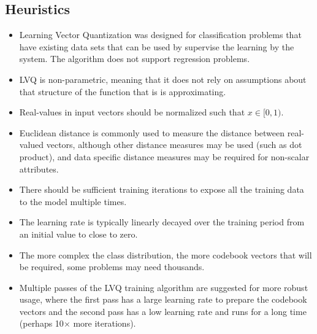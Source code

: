 \subsection{Heuristics}
\begin{itemize}
	\item Learning Vector Quantization was designed for classification problems that have existing data sets that can be used by supervise the learning by the system. The algorithm does not support regression problems.
	\item LVQ is non-parametric, meaning that it does not rely on assumptions about that structure of the function that is is approximating.
	\item Real-values in input vectors should be normalized such that $x \in [0,1)$. 
	\item Euclidean distance is commonly used to measure the distance between real-valued vectors, although other distance measures may be used (such as dot product), and data specific distance measures may be required for non-scalar attributes.
	\item There should be sufficient training iterations to expose all the training data to the model multiple times.
	\item The learning rate is typically linearly decayed over the training period from an initial value to close to zero.
	\item The more complex the class distribution, the more codebook vectors that will be required, some problems may need thousands.
	\item Multiple passes of the LVQ training algorithm are suggested for more robust usage, where the first pass has a large learning rate to prepare the codebook vectors and the second pass has a low learning rate and runs for a long time (perhaps 10$\times$ more iterations).
\end{itemize}

